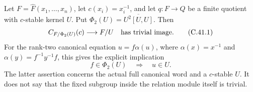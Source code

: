Let $F=\widehat F(x_1,\ldots,x_n)$, let $c(x_i)=x_i^{-1}$,
and let $q:F\to Q$ be a finite quotient with $c$-stable kernel $U$.
Put $\Phi_2(U)=\overline{U^2[U,U]}$. Then
\[
 C_{F/\Phi_2(U)}(c)\longrightarrow F/U
                 \quad\hbox{has trivial image}.                 \tag{C.41.1}
\]
For the rank-two canonical equation $u=f\alpha(u)$,
where $\alpha(x)=x^{-1}$ and $\alpha(y)=f^{-1}y^{-1}f$,
this gives the explicit implication
\[
                  f\in\Phi_2(U)\quad\Longrightarrow\quad u\in U.
                                                                    \tag{C.41.2}
\]
The latter assertion concerns the actual full canonical word and a
$c$-stable $U$. It does not say that the fixed subgroup inside the
relation module itself is trivial.

